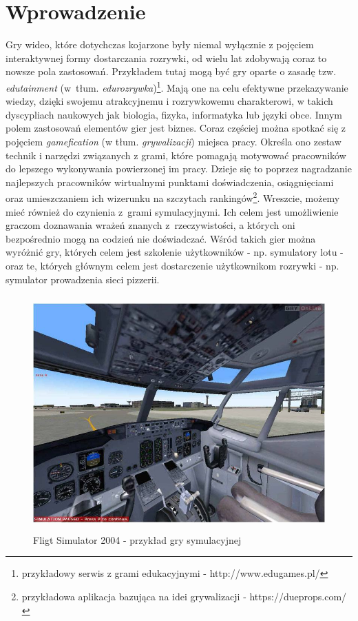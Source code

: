 \chapter*{Wprowadzenie}
Gry wideo, które dotychczas kojarzone były niemal wyłącznie z pojęciem interaktywnej formy dostarczania rozrywki, od wielu lat zdobywają coraz to nowsze pola zastosowań. Przykładem tutaj mogą być gry oparte o zasadę tzw. \emph{edutainment} (w~tłum. \emph{edurozrywka})\footnote{przykładowy serwis z grami edukacyjnymi - http://www.edugames.pl/}. Mają one na celu efektywne przekazywanie wiedzy, dzięki swojemu atrakcyjnemu i rozrywkowemu charakterowi, w takich dyscypliach naukowych jak biologia, fizyka, informatyka lub języki obce. 
Innym polem zastosowań elementów gier jest biznes. Coraz częściej można spotkać się z pojęciem \emph{gamefication} (w tłum. \emph{grywalizacji}) miejsca pracy. Określa ono zestaw technik i narzędzi związanych z grami, które pomagają motywować pracowników do lepszego wykonywania powierzonej im pracy. Dzieje się to poprzez nagradzanie najlepszych pracowników wirtualnymi punktami doświadczenia, osiągnięciami oraz umieszczaniem ich wizerunku na szczytach rankingów\footnote{przykładowa aplikacja bazująca na idei grywalizacji - https://dueprops.com/}.
Wreszcie, możemy mieć również do czynienia z~grami symulacyjnymi. Ich celem jest umożliwienie graczom doznawania wrażeń znanych z~rzeczywistości, a których oni bezpośrednio mogą na codzień nie doświadczać. Wśród takich gier można wyróżnić gry, których celem jest szkolenie użytkowników - np. symulatory lotu - oraz te, których głównym celem jest dostarczenie użytkownikom rozrywki - np. symulator prowadzenia sieci pizzerii.

\begin{figure}
\begin{center}
	\includegraphics[width=120mm,height=90mm]{images/flightSim}
	\caption{Fligt Simulator 2004 - przykład gry symulacyjnej}
\end{center}
\end{figure}

